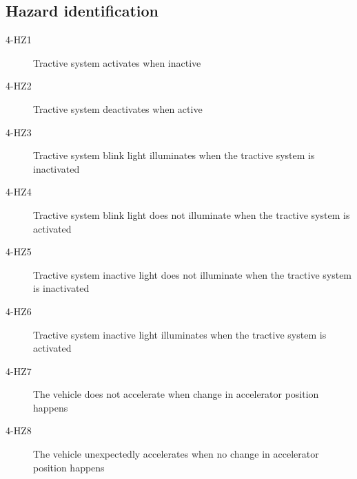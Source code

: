 \subsection{Hazard identification}
%

\begin{description}
	\item [4-HZ1] Tractive system activates when inactive
	\item [4-HZ2] Tractive system deactivates when active
	\item [4-HZ3] Tractive system blink light illuminates when the tractive system is inactivated
	\item [4-HZ4] Tractive system blink light does not illuminate	 when the tractive system is activated
	\item [4-HZ5] Tractive system inactive light does not illuminate when the tractive system is inactivated
	\item [4-HZ6] Tractive system inactive light illuminates when the tractive system is activated
	\item [4-HZ7] The vehicle does not accelerate when change in accelerator position happens 
	\item [4-HZ8] The vehicle unexpectedly accelerates when no change in accelerator position happens
\end{description}

%
%

